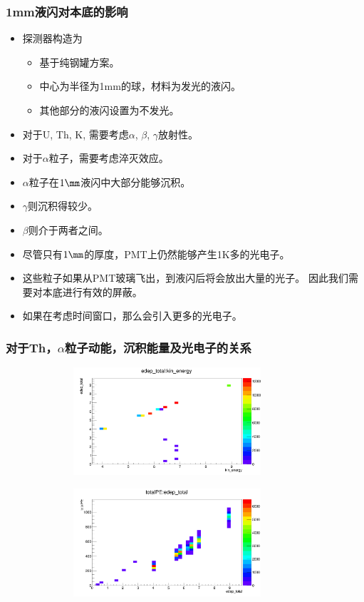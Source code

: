 \begin{frame}
    \frametitle{1mm液闪对本底的影响}
    \begin{itemize}
        \item 探测器构造为
            \begin{itemize}
                \item 基于纯钢罐方案。
                \item 中心为半径为1mm的球，材料为发光的液闪。
                \item 其他部分的液闪设置为不发光。
            \end{itemize}
        \item 对于U, Th, K, 需要考虑$\alpha$, $\beta$, $\gamma$放射性。
        \item 对于$\alpha$粒子，需要考虑淬灭效应。
        \item $\alpha$粒子在$1\mm$液闪中大部分能够沉积。
        \item $\gamma$则沉积得较少。
        \item $\beta$则介于两者之间。
        \item 尽管只有$1\mm$的厚度，PMT上仍然能够产生1K多的光电子。
        \item 这些粒子如果从PMT玻璃飞出，到液闪后将会放出大量的光子。
              因此我们需要对本底进行有效的屏蔽。
        \item 如果在考虑时间窗口，那么会引入更多的光电子。
    \end{itemize}
\end{frame}

\begin{frame}
    \frametitle{对于Th，$\alpha$粒子动能，沉积能量及光电子的关系}
    \includegraphics[width=12cm,height=4cm]{data/Th_alpha_edep_vs_kine.png}

    \includegraphics[width=12cm,height=4cm]{data/Th_alpha_totalPE_vs_edep.png}
\end{frame}

